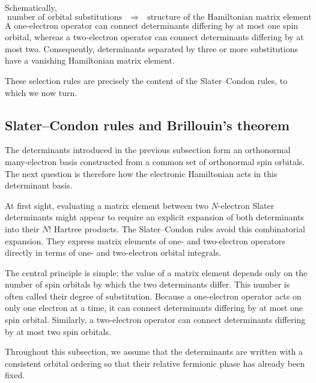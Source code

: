 \documentclass[11pt,a4paper,titlepage]{article}
\numberwithin{equation}{section}
\begin{document}
Schematically,
\begin{equation*}
  \boxed{
  \text{number of orbital substitutions}
  \quad\Longrightarrow\quad
  \text{structure of the Hamiltonian matrix element}
  }
\end{equation*}
A one-electron operator can connect determinants differing by at most one
spin orbital, whereas a two-electron operator can connect determinants
differing by at most two. Consequently, determinants separated by three or
more substitutions have a vanishing Hamiltonian matrix element.

These selection rules are precisely the content of the
Slater--Condon rules, to which we now turn.

\subsection{Slater--Condon rules and Brillouin's theorem}
\label{sec:slater-condon}

The determinants introduced in the previous subsection form an orthonormal
many-electron basis constructed from a common set of orthonormal spin
orbitals. The next question is therefore how the electronic Hamiltonian acts
in this determinant basis.

At first sight, evaluating a matrix element between two $N$-electron Slater
determinants might appear to require an explicit expansion of both
determinants into their $N!$ Hartree products. The
Slater--Condon rules \citep{Slater1929,Condon1930} avoid this combinatorial expansion. They express
matrix elements of one- and two-electron operators directly in terms of
one- and two-electron orbital integrals.

\hfBioCondon

The central principle is simple: the value of a matrix element depends only
on the number of spin orbitals by which the two determinants differ. This
number is often called their degree of substitution. Because a
one-electron operator acts on only one electron at a time, it can connect
determinants differing by at most one spin orbital. Similarly, a
two-electron operator can connect determinants differing by at most two spin
orbitals.

Throughout this subsection, we assume that the determinants are written
with a consistent orbital ordering so that their relative fermionic phase
has already been fixed.

\end{document}
